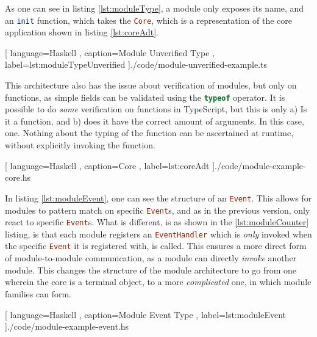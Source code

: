 As one can see in listing \ref{lst:moduleType}, a module only exposes its name,
and an \lstinline[language=haskell]{init} function, which takes the
\lstinline[language=haskell]{Core}, which is a representation of
the core application shown in listing \ref{lst:coreAdt}.

\begin{center}
  
   [ language=Haskell
   , caption={Module Unverified Type}
   , label=lst:moduleTypeUnverified
   ]{./code/module-unverified-example.ts}
\end{center}

This architecture also has the issue about verification of modules, but only on
functions, as simple fields can be validated using the
\lstinline[language=JavaScript]{typeof} operator. It is possible to do
\textit{some} verification on functions in TypeScript, but this is only a) Is it
a function, and b) does it have the correct amount of arguments. In this case,
one. Nothing about the typing of the function can be ascertained at runtime,
without explicitly invoking the function.

\begin{center}
  
    [ language=Haskell
    , caption={Core}
    , label=lst:coreAdt
    ]{./code/module-example-core.hs}
\end{center}

In listing \ref{lst:moduleEvent}, one can see the structure of an
\lstinline[language=Haskell]{Event}. This allows for modules to
pattern match on specific \lstinline[language=Haskell]{Event}s, and as in the
previous version, only react to specific \lstinline[language=Haskell]{Event}s.
What is different, is as shown in the \ref{lst:moduleCounter} listing, is that
each module registers an \lstinline[language=Haskell]{EventHandler} which is
\textit{only} invoked when the specific \lstinline[language=Haskell]{Event} it
is registered with, is called. This ensures a more direct form of
module-to-module communication, as a module can directly \textit{invoke} another
module. This changes the structure of the module architecture to go from one
wherein the core is a terminal object, to a more \textit{complicated} one, in
which module families can form.

\begin{center}
  
    [ language=Haskell
    , caption={Module Event Type}
    , label=lst:moduleEvent
    ]{./code/module-example-event.hs}
\end{center}

